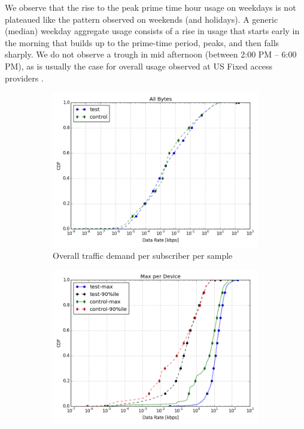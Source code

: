 We observe that the rise to the peak prime time hour usage 
on weekdays is not plateaued like the pattern observed on weekends (and 
holidays). A generic (median) weekday aggregate usage consists of a rise in 
usage that starts early in the morning that builds up to the prime-time period, 
peaks, and then falls sharply. We do not observe a trough in mid afternoon 
(between 2:00 PM -- 6:00 PM), as is usually the case for overall usage observed 
at US Fixed access providers \cite{sandvine20141h}.




\begin{figure}[ht]
\begin{minipage}{1\linewidth}
\centering
%
\begin{subfigure}[b]{0.33\linewidth}
\includegraphics[width=\linewidth]{figures/cdf-all-bytes.png}
               \caption{Overall traffic demand per subscriber per 
sample\label{fig:CDF-data-rate}}
\end{subfigure}
%
\begin{subfigure}[b]{0.33\linewidth}
\includegraphics[width=\linewidth]{figures/cdf-max-per-device.png}

\end{subfigure}
\end{minipage}
\end{figure}
